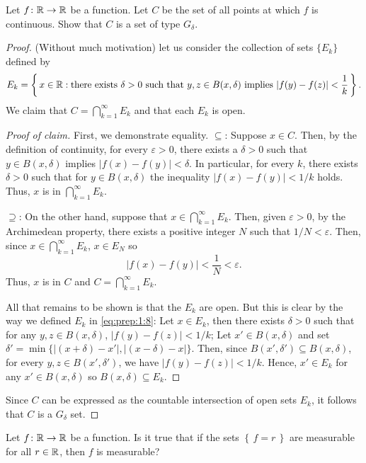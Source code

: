 \begin{problem}
Let $f\colon\mathbb{R}\to\mathbb{R}$ be a function. Let $C$ be the set of all points
at which $f$ is continuous. Show that $C$ is a set of type $G_\delta$.
\end{problem}
\begin{proof}
(Without much motivation) let us consider the collection of sets $\{E_k\}$
defined by
\begin{equation}
\label{eq:prep:1:8}
E_k=\left\{\,x\in\mathbb{R}:
\text{there exists $\delta>0$ such that $y,z\in B(x,\delta)$ implies $\left|f(y)-f(z)\right|<\frac{1}{k}$}\,\right\}.
\end{equation}
We claim that $C=\bigcap_{k=1}^\infty E_k$ and that each $E_k$ is open.
\begin{proof}[Proof of claim]
\renewcommand{\qedsymbol}{$\clubsuit$}
First, we demonstrate equality. $\subseteq$: Suppose $x\in C$. Then, by the
definition of continuity, for every $\varepsilon>0$, there exists a
$\delta>0$ such that $y\in B(x,\delta)$ implies $|f(x)-f(y)|<\delta$. In
particular, for every $k$, there exists $\delta>0$ such that for $y\in
B(x,\delta)$ the inequality $|f(x)-f(y)|<1/k$ holds. Thus, $x$ is in
$\bigcap_{k=1}^\infty E_k$.

$\supseteq$: On the other hand, suppose that $x\in\bigcap_{k=1}^\infty
E_k$. Then, given $\varepsilon>0$, by the Archimedean property, there
exists a positive integer $N$ such that $1/N<\varepsilon$. Then, since
$x\in\bigcap_{k=1}^\infty E_k$, $x\in E_N$ so
\begin{equation}
  \label{eq:prep:1:9}
|f(x)-f(y)|<\frac{1}{N}<\varepsilon.
\end{equation}
Thus, $x$ is in $C$ and $C=\bigcap_{k=1}^\infty E_k$.

All that remains to be shown is that the $E_k$ are open. But this is clear
by the way we defined $E_k$ in \eqref{eq:prep:1:8}: Let $x\in E_k$, then
there exists $\delta>0$ such that for any $y,z\in B(x,\delta)$,
$|f(y)-f(z)|<1/k$; Let $x'\in B(x,\delta)$ and set
$\delta'=\min\{|(x+\delta)-x'|,|(x-\delta)-x|\}$. Then, since
$B(x',\delta')\subseteq B(x,\delta)$, for every $y,z\in B(x',\delta')$, we
have $|f(y)-f(z)|<1/k$. Hence, $x'\in E_k$ for any $x'\in B(x,\delta)$
so $B(x,\delta)\subseteq E_k$.
\end{proof}
Since $C$ can be expressed as the countable intersection of open sets
$E_k$, it follows that $C$ is a $G_\delta$ set.
\end{proof}
\begin{problem}
Let $f\colon\mathbb{R}\to\mathbb{R}$ be a function. Is it true that if the sets
$\left\{\,f=r\,\right\}$ are measurable for all $r\in\mathbb{R}$, then $f$ is
measurable?
\end{problem}
